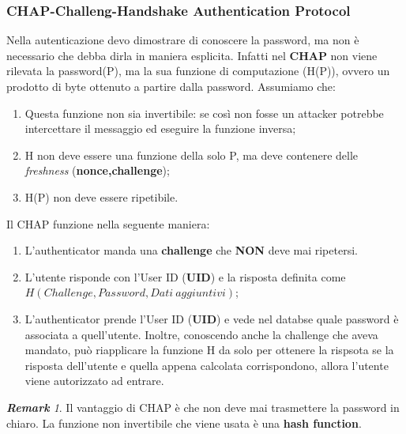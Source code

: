 \documentclass{article}
\theoremstyle{remark}
\newtheorem*{remark}{\textbf{Remark}}
\begin{document}
\subsubsection{CHAP-Challeng-Handshake Authentication Protocol}
Nella autenticazione devo dimostrare di conoscere la password, ma non è necessario che debba dirla in maniera esplicita. Infatti nel \textbf{CHAP} non viene rilevata la password(P), ma la sua funzione di computazione (H(P)), ovvero un prodotto di byte ottenuto a partire dalla password. Assumiamo che:\begin{enumerate}
    \item Questa funzione non sia invertibile: se così non fosse un attacker potrebbe intercettare il messaggio ed eseguire la funzione inversa;
    \item H non deve essere una funzione della solo P, ma deve contenere delle \emph{freshness} (\textbf{nonce,challenge});
    \item H(P) non deve essere ripetibile.
\end{enumerate}
Il CHAP funzione nella seguente maniera:\begin{enumerate}
    \item L'authenticator manda una \textbf{challenge} che \textbf{NON} deve mai ripetersi.
    \item L'utente risponde con l'User ID (\textbf{UID}) e la risposta definita come $H(Challenge,Password,Dati\ aggiuntivi)$;
    \item L'authenticator prende l'User ID (\textbf{UID}) e vede nel databse quale password è associata a quell'utente. Inoltre, conoscendo anche la challenge che aveva mandato, può riapplicare la funzione H da solo per ottenere la rispsota se la risposta dell'utente e quella appena calcolata corrispondono, allora l'utente viene autorizzato ad entrare.
\end{enumerate}
\begin{remark}
Il vantaggio di CHAP è che non deve mai trasmettere la password in chiaro. La funzione non invertibile che viene usata è una \textbf{hash function}.
\end{remark}
\end{document}
